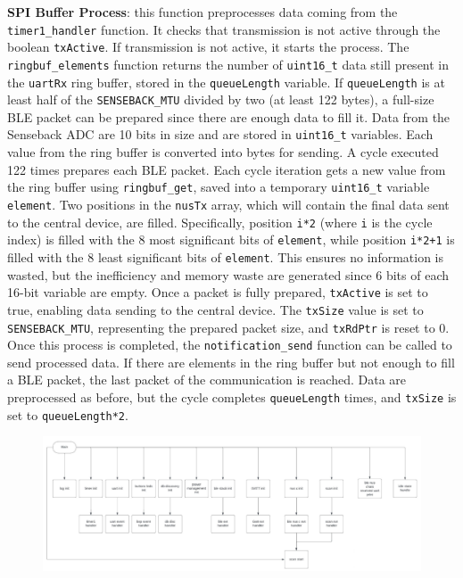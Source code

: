 \documentclass{Configuration_Files/PoliMi3i_thesis}
\begin{document}
\textbf{SPI Buffer Process}: this function preprocesses data coming from the \texttt{timer1\_handler} function. It checks that transmission is not active through the boolean \texttt{txActive}. If transmission is not active, it starts the process. The \texttt{ringbuf\_elements} function returns the number of \texttt{uint16\_t} data still present in the \texttt{uartRx} ring buffer, stored in the \texttt{queueLength} variable. If \texttt{queueLength} is at least half of the \texttt{SENSEBACK\_MTU} divided by two (at least 122 bytes), a full-size BLE packet can be prepared since there are enough data to fill it. Data from the Senseback ADC are 10 bits in size and are stored in \texttt{uint16\_t} variables. Each value from the ring buffer is converted into bytes for sending. A cycle executed 122 times prepares each BLE packet. Each cycle iteration gets a new value from the ring buffer using \texttt{ringbuf\_get}, saved into a temporary \texttt{uint16\_t} variable \texttt{element}. Two positions in the \texttt{nusTx} array, which will contain the final data sent to the central device, are filled. Specifically, position \texttt{i*2} (where \texttt{i} is the cycle index) is filled with the 8 most significant bits of \texttt{element}, while position \texttt{i*2+1} is filled with the 8 least significant bits of \texttt{element}. This ensures no information is wasted, but the inefficiency and memory waste are generated since 6 bits of each 16-bit variable are empty. Once a packet is fully prepared, \texttt{txActive} is set to true, enabling data sending to the central device. The \texttt{txSize} value is set to \texttt{SENSEBACK\_MTU}, representing the prepared packet size, and \texttt{txRdPtr} is reset to 0. Once this process is completed, the \texttt{notification\_send} function can be called to send processed data. If there are elements in the ring buffer but not enough to fill a BLE packet, the last packet of the communication is reached. Data are preprocessed as before, but the cycle completes \texttt{queueLength} times, and \texttt{txSize} is set to \texttt{queueLength*2}.

\begin{figure}[H]
	\includegraphics[scale=0.3]{Previous Implementation/Screenshot 2024-08-15 at 11.01.10.png}
	\centering
\end{figure}
\end{document}
